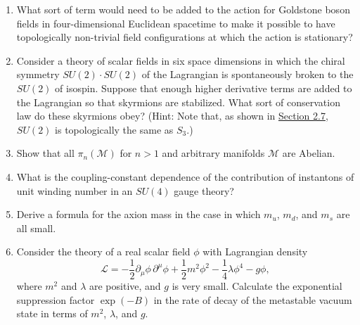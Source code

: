

\begin{enumerate}
\item What sort of term would need to be added to the action for Goldstone
boson fields in four-dimensional Euclidean spacetime to make it possible to
have topologically non-trivial field configurations at which the action is
stationary?

\item Consider a theory of scalar fields in six space dimensions in which
the chiral symmetry $SU(2)\cdot SU(2)$ of the Lagrangian is spontaneously
broken to the $SU(2)$ of isospin. Suppose that enough higher derivative
terms are added to the Lagrangian so that skyrmions are stabilized. What
sort of conservation law do these skyrmions obey? (Hint: Note that, as
shown in \hyperref[sec:2.7]{Section 2.7}, $SU(2)$ is topologically the same
as $S_3$.)

\item Show that all $\pi_n(\mathcal M)$ for $n>1$ and arbitrary manifolds
$\mathcal M$ are Abelian.

\item What is the coupling-constant dependence of the contribution of
instantons of unit winding number in an $SU(4)$ gauge theory?

\item Derive a formula for the axion mass in the case in which $m_u$,
$m_d$, and $m_s$ are all small.

\item Consider the theory of a real scalar field $\phi$ with Lagrangian
density
\[
 \mathcal L=-\frac12\partial_\mu\phi\,\partial^\mu\phi
 +\frac12m^2\phi^2-\frac14\lambda\phi^4-g\phi,
\]
where $m^2$ and $\lambda$ are positive, and $g$ is very small. Calculate
the exponential suppression factor $\exp(-B)$ in the rate of decay of the
metastable vacuum state in terms of $m^2$, $\lambda$, and $g$.
\end{enumerate}

